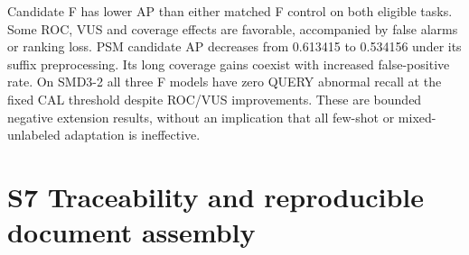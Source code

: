 \documentclass[
  english,
  9pt,
]{article}
\begin{document}
Candidate F has lower AP than either matched F control on both eligible
tasks. Some ROC, VUS and coverage effects are favorable, accompanied by
false alarms or ranking loss. PSM candidate AP decreases from 0.613415
to 0.534156 under its suffix preprocessing. Its long coverage gains
coexist with increased false-positive rate. On SMD3-2 all three F models
have zero QUERY abnormal recall at the fixed CAL threshold despite
ROC/VUS improvements. These are bounded negative extension results,
without an implication that all few-shot or mixed-unlabeled adaptation
is ineffective.

\section{S7 Traceability and reproducible document
assembly}\label{s7-traceability-and-reproducible-document-assembly}
\end{document}
